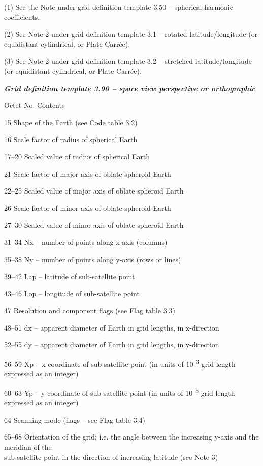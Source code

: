 (1) See the Note under grid definition template 3.50 -- spherical harmonic coefficients.

(2) See Note 2 under grid definition template 3.1 -- rotated latitude/longitude (or equidistant cylindrical, or Plate Carrée).

(3) See Note 2 under grid definition template 3.2 -- stretched latitude/longitude (or equidistant cylindrical, or Plate Carrée).

\emph{\textbf{Grid definition template 3.90 -- space view perspective or orthographic}}

Octet No. Contents

15 Shape of the Earth (see Code table 3.2)

16 Scale factor of radius of spherical Earth

17--20 Scaled value of radius of spherical Earth

21 Scale factor of major axis of oblate spheroid Earth

22--25 Scaled value of major axis of oblate spheroid Earth

26 Scale factor of minor axis of oblate spheroid Earth

27--30 Scaled value of minor axis of oblate spheroid Earth

31--34 Nx -- number of points along x-axis (columns)

35--38 Ny -- number of points along y-axis (rows or lines)

39--42 Lap -- latitude of sub-satellite point

43--46 Lop -- longitude of sub-satellite point

47 Resolution and component flags (see Flag table 3.3)

48--51 dx -- apparent diameter of Earth in grid lengths, in x-direction

52--55 dy -- apparent diameter of Earth in grid lengths, in y-direction

56--59 Xp -- x-coordinate of sub-satellite point (in units of 10\textsuperscript{--3} grid length expressed as an integer)

60--63 Yp -- y-coordinate of sub-satellite point (in units of 10\textsuperscript{--3} grid length expressed as an integer)

64 Scanning mode (flags -- see Flag table 3.4)

65--68 Orientation of the grid; i.e. the angle between the increasing y-axis and the meridian of the\\
sub-satellite point in the direction of increasing latitude (see Note 3)

